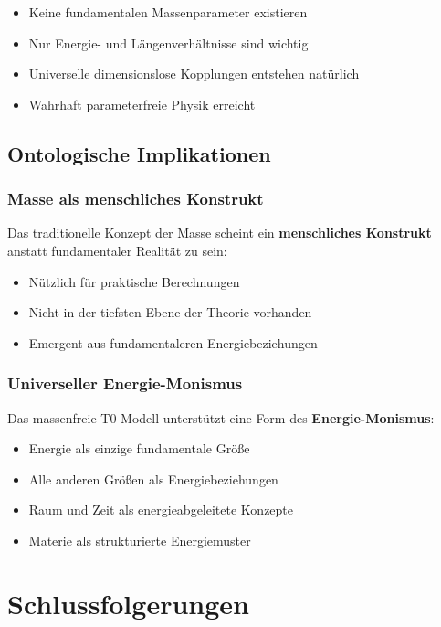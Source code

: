 	\begin{itemize}
		\item Keine fundamentalen Massenparameter existieren
		\item Nur Energie- und Längenverhältnisse sind wichtig
		\item Universelle dimensionslose Kopplungen entstehen natürlich
		\item Wahrhaft parameterfreie Physik erreicht
	\end{itemize}
	
	\subsection{Ontologische Implikationen}
	\label{subsec:ontological}
	
	\subsubsection{Masse als menschliches Konstrukt}
	
	Das traditionelle Konzept der Masse scheint ein \textbf{menschliches Konstrukt} anstatt fundamentaler Realität zu sein:
	
	\begin{itemize}
		\item Nützlich für praktische Berechnungen
		\item Nicht in der tiefsten Ebene der Theorie vorhanden
		\item Emergent aus fundamentaleren Energiebeziehungen
	\end{itemize}
	
	\subsubsection{Universeller Energie-Monismus}
	
	Das massenfreie T0-Modell unterstützt eine Form des \textbf{Energie-Monismus}:
	\begin{itemize}
		\item Energie als einzige fundamentale Größe
		\item Alle anderen Größen als Energiebeziehungen
		\item Raum und Zeit als energieabgeleitete Konzepte
		\item Materie als strukturierte Energiemuster
	\end{itemize}
	
	\section{Schlussfolgerungen}
	\label{sec:conclusions}
	
